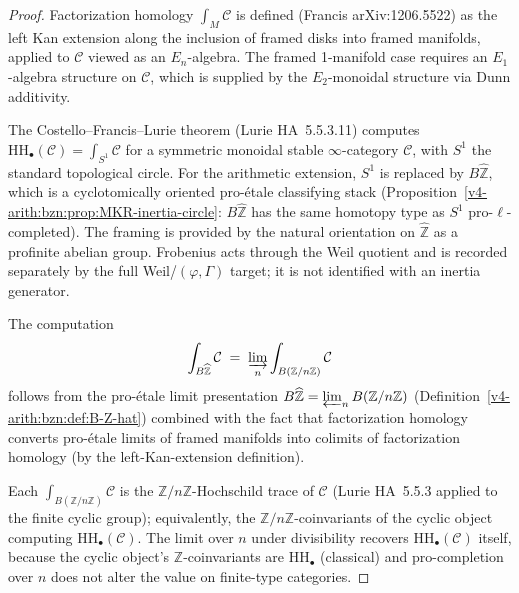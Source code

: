 \begin{proof}
Factorization homology \(\int_{M}\mathcal{C}\) is defined (Francis
arXiv:1206.5522) as the left Kan extension along the inclusion
of framed disks into framed manifolds, applied to \(\mathcal{C}\)
viewed as an \(E_{n}\)-algebra. The framed 1-manifold case requires
an \(E_{1}\)-algebra structure on \(\mathcal{C}\), which is supplied
by the \(E_{2}\)-monoidal structure via Dunn additivity.

The Costello--Francis--Lurie theorem (Lurie HA~5.5.3.11) computes
\(\mathrm{HH}_{\bullet}(\mathcal{C})=\int_{S^{1}}\mathcal{C}\) for a
symmetric monoidal stable \(\infty\)-category \(\mathcal{C}\), with
\(S^{1}\) the standard topological circle. For the arithmetic
extension, \(S^{1}\) is replaced by \(B\widehat{\mathbb{Z}}\), which
is a cyclotomically oriented pro-\'etale classifying stack
(Proposition~\ref{v4-arith:bzn:prop:MKR-inertia-circle}: \(B\widehat{\mathbb{Z}}\)
has the same homotopy type as \(S^{1}\) pro-\(\ell\)-completed).
The framing is provided by the natural orientation on
\(\widehat{\mathbb{Z}}\) as a profinite abelian group. Frobenius acts
through the Weil quotient and is recorded separately by the full
Weil/\((\varphi,\Gamma)\) target; it is not identified with an inertia
generator.

The computation
\begin{equation}
\int_{B\widehat{\mathbb{Z}}}\mathcal{C}\;=\;\varinjlim_{n}\int_{B(\mathbb{Z}/n\mathbb{Z})}\mathcal{C}
\end{equation}
follows from the pro-\'etale limit presentation
\(B\widehat{\mathbb{Z}}=\varprojlim_{n}B(\mathbb{Z}/n\mathbb{Z})\)
(Definition~\ref{v4-arith:bzn:def:B-Z-hat}) combined with the fact that
factorization homology converts pro-\'etale limits of framed
manifolds into colimits of factorization homology (by the
left-Kan-extension definition).

Each \(\int_{B(\mathbb{Z}/n\mathbb{Z})}\mathcal{C}\) is the
\(\mathbb{Z}/n\mathbb{Z}\)-Hochschild trace of \(\mathcal{C}\)
(Lurie HA~5.5.3 applied to the finite cyclic group);
equivalently, the \(\mathbb{Z}/n\mathbb{Z}\)-coinvariants of the
cyclic object computing \(\mathrm{HH}_{\bullet}(\mathcal{C})\).
The limit over \(n\) under divisibility recovers
\(\mathrm{HH}_{\bullet}(\mathcal{C})\) itself, because the cyclic
object's \(\mathbb{Z}\)-coinvariants are \(\mathrm{HH}_{\bullet}\)
(classical) and pro-completion over \(n\) does not alter the
value on finite-type categories.
\end{proof}

